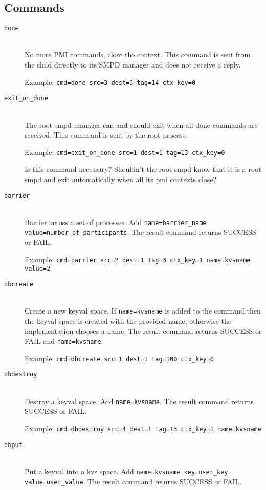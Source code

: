 \documentclass[dvipdfm,11pt]{article}
\begin{document}
\subsection{Commands}
\begin{description}
\item[\texttt{done}]\mbox{}\\
No more PMI commands, close the context.  This command is sent from the 
child directly to its SMPD manager and does not receive a reply.

Example: \texttt{cmd=done src=3 dest=3 tag=14 ctx\_key=0}
\item[\texttt{exit\_on\_done}]\mbox{}\\
The root smpd manager can and should exit when all done commands are received.
This command is sent by the root process.

Example: \texttt{cmd=exit\_on\_done src=1 dest=1 tag=13 ctx\_key=0}

Is this command necessary?  Shouldn't the root smpd know that it is a root smpd
and exit automatically when all its pmi contexts close?
\item[\texttt{barrier}]\mbox{}\\
Barrier across a set of processes. 
Add \texttt{name=barrier\_name value=number\_of\_participants}.
The result command returns SUCCESS or FAIL.

Example: \texttt{cmd=barrier src=2 dest=1 tag=3 ctx\_key=1 name=kvsname value=2}
\item[\texttt{dbcreate}]\mbox{}\\
Create a new keyval space.  If \texttt{name=kvsname} is added to the command
then the keyval space is created with the provided name, otherwise the 
implementation chooses a name.
The result command returns SUCCESS or FAIL and \texttt{name=kvsname}.

Example: \texttt{cmd=dbcreate src=1 dest=1 tag=100 ctx\_key=0}
\item[\texttt{dbdestroy}]\mbox{}\\
Destroy a keyval space.  Add \texttt{name=kvsname}.
The result command returns SUCCESS or FAIL.

Example: \texttt{cmd=dbdestroy src=4 dest=1 tag=13 ctx\_key=1 name=kvsname}
\item[\texttt{dbput}]\mbox{}\\
Put a keyval into a kvs space.  Add \texttt{name=kvsname key=user\_key 
value=user\_value}.
The result command returns SUCCESS or FAIL.


\end{description}
\end{document}
